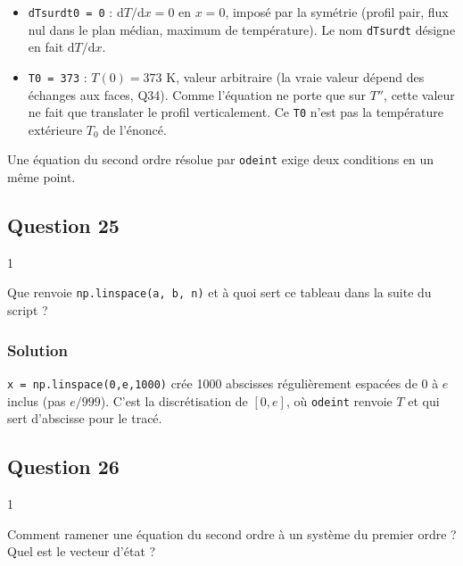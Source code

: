\documentclass[11pt,a4paper]{article}
\providecommand{\tightlist}{\setlength{\itemsep}{0pt}\setlength{\parskip}{0pt}}
\begin{document}
\begin{itemize}
\tightlist
\item
  \texttt{dTsurdt0\ =\ 0} : \(\mathrm dT/\mathrm dx=0\) en \(x=0\), imposé par la symétrie (profil pair, flux nul dans le plan médian, maximum de température). Le nom \texttt{dTsurdt} désigne en fait \(\mathrm dT/\mathrm dx\).
\item
  \texttt{T0\ =\ 373} : \(T(0)=373\) K, valeur arbitraire (la vraie valeur dépend des échanges aux faces, Q34). Comme l'équation ne porte que sur \(T''\), cette valeur ne fait que translater le profil verticalement. Ce \texttt{T0} n'est pas la température extérieure \(T_0\) de l'énoncé.
\end{itemize}

Une équation du second ordre résolue par \texttt{odeint} exige deux conditions en un même point.

\hypertarget{question-25}{%
\subsection{Question 25}\label{question-25}}

\begin{indication}{1}

Que renvoie \texttt{np.linspace(\allowbreak{}a,\allowbreak{}\ b,\allowbreak{}\ n)\allowbreak{}} et à quoi sert ce tableau dans la suite du script ?

\end{indication}

\hypertarget{solution-24}{%
\subsubsection{Solution}\label{solution-24}}

\texttt{x\ =\allowbreak{}\ np.linspace(\allowbreak{}0,\allowbreak{}e,\allowbreak{}1000)\allowbreak{}} crée 1000 abscisses régulièrement espacées de 0 à \(e\) inclus (pas \(e/999\)). C'est la discrétisation de \([0,e]\), où \texttt{odeint} renvoie \(T\) et qui sert d'abscisse pour le tracé.

\hypertarget{question-26}{%
\subsection{Question 26}\label{question-26}}

\begin{indication}{1}

Comment ramener une équation du second ordre à un système du premier ordre ? Quel est le vecteur d'état ?

\end{indication}
\end{document}
